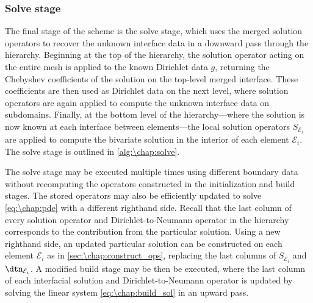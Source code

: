 \subsubsection{Solve stage}\label{sec:\chap:ultra_hps:solve}
The final stage of the scheme is the solve stage, which uses the merged solution operators to recover the unknown interface data in a downward pass through the hierarchy. Beginning at the top of the hierarchy, the solution operator acting on the entire mesh is applied to the known Dirichlet data $g$, returning the Chebyshev coefficients of the solution on the top-level merged interface. These coefficients are then used as Dirichlet data on the next level, where solution operators are again applied to compute the unknown interface data on subdomains. Finally, at the bottom level of the hierarchy---where the solution is now known at each interface between elements---the local solution operators $S_{\mathcal{E}_i}$ are applied to compute the bivariate solution in the interior of each element $\mathcal{E}_i$. The solve stage is outlined in \cref{alg:\chap:solve}.

The solve stage may be executed multiple times using different boundary data without recomputing the operators constructed in the initialization and build stages. The stored operators may also be efficiently updated to solve \cref{eq:\chap:pde} with a different righthand side. Recall that the last column of every solution operator and Dirichlet-to-Neumann operator in the hierarchy corresponds to the contribution from the particular solution. Using a new righthand side, an updated particular solution can be constructed on each element $\mathcal{E}_i$ as in \cref{sec:\chap:construct_ops}, replacing the last columns of $S_{\mathcal{E}_i}$ and $\dtn_{\mathcal{E}_i}$. A modified build stage may be then be executed, where the last column of each interfacial solution and Dirichlet-to-Neumann operator is updated by solving the linear system \cref{eq:\chap:build_sol} in an upward pass.

